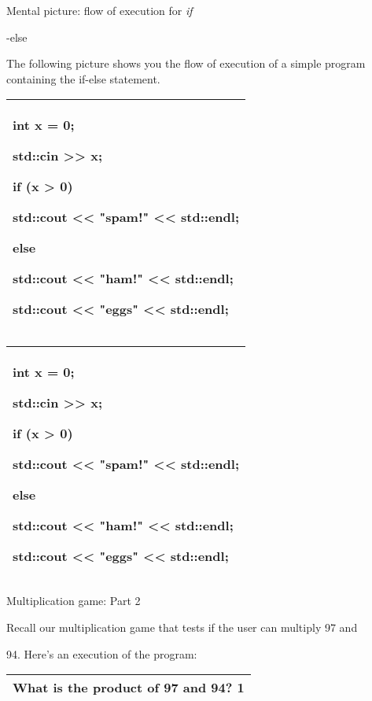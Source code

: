 \documentclass[
]{article}
\begin{document}
Mental picture: flow of execution for \emph{if}

-else

The following picture shows you the flow of execution of a simple
program containing the if-else statement.

\begin{longtable}[]{@{}l@{}}
\toprule
\endhead
\begin{minipage}[t]{0.97\columnwidth}\raggedright
int x = 0;

std::cin \textgreater\textgreater{} x;

if (x \textgreater{} 0)

std::cout \textless\textless{} "spam!" \textless\textless{} std::endl;

else

std::cout \textless\textless{} "ham!" \textless\textless{} std::endl;

std::cout \textless\textless{} "eggs" \textless\textless{}
std::endl;\strut
\end{minipage}\tabularnewline
\bottomrule
\end{longtable}

\begin{longtable}[]{@{}l@{}}
\toprule
\endhead
\begin{minipage}[t]{0.97\columnwidth}\raggedright
int x = 0;

std::cin \textgreater\textgreater{} x;

if (x \textgreater{} 0)

std::cout \textless\textless{} "spam!" \textless\textless{} std::endl;

else

std::cout \textless\textless{} "ham!" \textless\textless{} std::endl;

std::cout \textless\textless{} "eggs" \textless\textless{}
std::endl;\strut
\end{minipage}\tabularnewline
\bottomrule
\end{longtable}

Multiplication game: Part 2

Recall our multiplication game that tests if the user can multiply 97
and

94. Here's an execution of the program:

\begin{longtable}[]{@{}l@{}}
\toprule
\endhead
What is the product of 97 and 94? \textbf{1}\tabularnewline
\bottomrule
\end{longtable}
\end{document}
